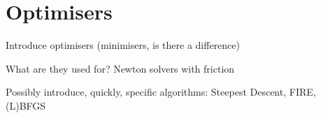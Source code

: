 \section{Optimisers}
\label{sec:optimisers}

\bit
\item Introduce optimisers (minimisers, is there a difference)
\item What are they used for? Newton solvers with friction
\item Possibly introduce, quickly, specific algorithms: Steepest Descent, FIRE, (L)BFGS
\eit

\placeholder

